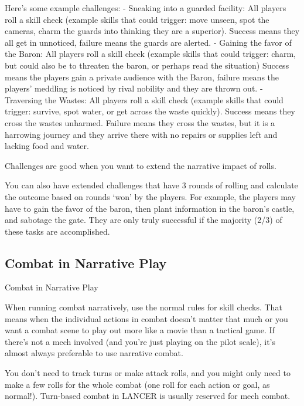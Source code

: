Here’s some example challenges:
    -    Sneaking into a guarded facility: All players roll a skill check (example skills that could
         trigger: move unseen, spot the cameras, charm the guards into thinking they are a
         superior). Success means they all get in unnoticed, failure means the guards are alerted.
    -    Gaining the favor of the Baron: All players roll a skill check (example skills that could
         trigger: charm, but could also be to threaten the baron, or perhaps read the situation)
         Success means the players gain a private audience with the Baron, failure means the
         players’ meddling is noticed by rival nobility and they are thrown out.
    -    Traversing the Wastes: All players roll a skill check (example skills that could trigger:
         survive, spot water, or get across the waste quickly). Success means they cross the
         wastes unharmed. Failure means they cross the wastes, but it is a harrowing journey and
         they arrive there with no repairs or supplies left and lacking food and water.

Challenges are good when you want to extend the narrative impact of rolls.

You can also have extended challenges that have 3 rounds of rolling and calculate the outcome
based on rounds ‘won’ by the players. For example, the players may have to gain the favor of the
baron, then plant information in the baron’s castle, and sabotage the gate. They are only truly
successful if the majority (2/3) of these tasks are accomplished.

\subsection{Combat in Narrative Play}
                                      Combat in Narrative Play


When running combat narratively, use the normal rules for skill checks. That means when the
individual actions in combat doesn’t matter that much or you want a combat scene to play out
more like a movie than a tactical game. If there’s not a mech involved (and you’re just playing on
the pilot scale), it’s almost always preferable to use narrative combat.





You don’t need to track turns or make attack rolls, and you might only need to make a few rolls
for the whole combat (one roll for each action or goal, as normal!). Turn-based combat in
LANCER is usually reserved for mech combat.


